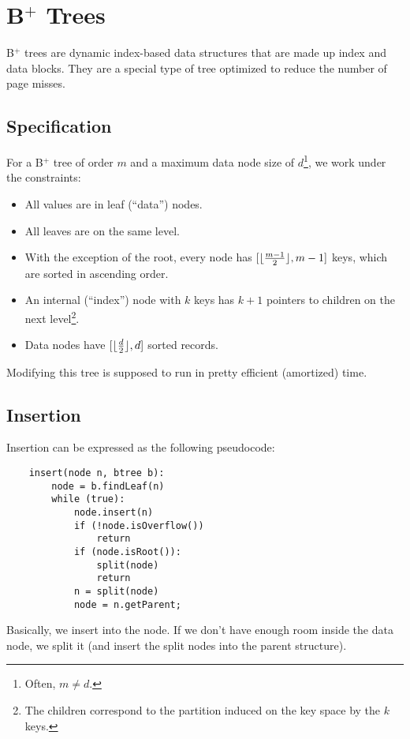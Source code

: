             \section{B$^+$ Trees} %
            \label{sec:b_trees}
                B$^+$ trees are dynamic index-based data structures that are made up index and data blocks.
                They are a special type of tree optimized to reduce the number of page misses.
                \subsection{Specification} %
                \label{sub:specification}
                    For a B$^+$ tree of order $m$ and a maximum data node size of $d$\footnote{Often, $m \ne d$.}, we work under the constraints:
                    \begin{itemize}
                        \item All values are in leaf (``data'') nodes.
                        \item All leaves are on the same level.
                        \item With the exception of the root, every node has $[\lfloor\frac{m-1}{2}\rfloor, m-1]$ keys, which are sorted in ascending order.
                        \item An internal (``index'') node with $k$ keys has $k+1$ pointers to children on the next level\footnote{The children correspond to the partition induced on the key space by the $k$ keys.}.
                        \item Data nodes have $[\lfloor\frac{d}{2}\rfloor, d]$ sorted records.
                    \end{itemize}
                Modifying this tree is supposed to run in pretty efficient (amortized) time.
                \subsection{Insertion} %
                \label{sub:insertion}
                    Insertion can be expressed as the following pseudocode:
                    \begin{verbatim}
    insert(node n, btree b):
        node = b.findLeaf(n)
        while (true):
            node.insert(n)
            if (!node.isOverflow())
                return
            if (node.isRoot()):
                split(node)
                return
            n = split(node)
            node = n.getParent;
                    \end{verbatim}
                    Basically, we insert into the node.
                    If we don't have enough room inside the data node, we split it (and insert the split nodes into the parent structure).

